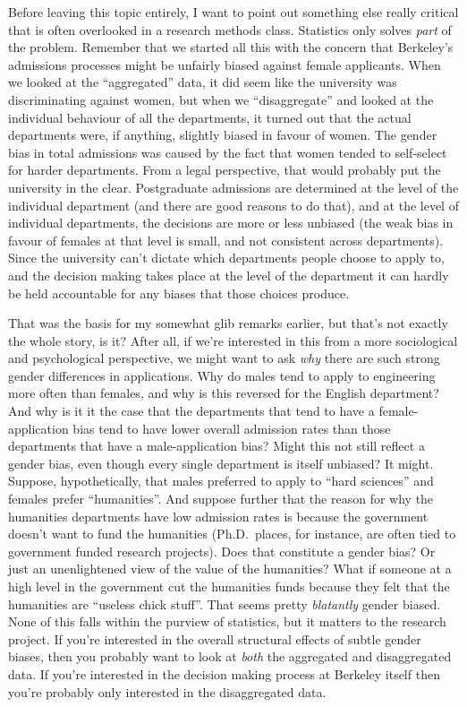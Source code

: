 \documentclass[]{book}
\begin{document}
Before leaving this topic entirely, I want to point out something else really critical that is often overlooked in a research methods class. Statistics only solves \emph{part} of the problem. Remember that we started all this with the concern that Berkeley's admissions processes might be unfairly biased against female applicants. When we looked at the ``aggregated'' data, it did seem like the university was discriminating against women, but when we ``disaggregate'' and looked at the individual behaviour of all the departments, it turned out that the actual departments were, if anything, slightly biased in favour of women. The gender bias in total admissions was caused by the fact that women tended to self-select for harder departments. From a legal perspective, that would probably put the university in the clear. Postgraduate admissions are determined at the level of the individual department (and there are good reasons to do that), and at the level of individual departments, the decisions are more or less unbiased (the weak bias in favour of females at that level is small, and not consistent across departments). Since the university can't dictate which departments people choose to apply to, and the decision making takes place at the level of the department it can hardly be held accountable for any biases that those choices produce.

That was the basis for my somewhat glib remarks earlier, but that's not exactly the whole story, is it? After all, if we're interested in this from a more sociological and psychological perspective, we might want to ask \emph{why} there are such strong gender differences in applications. Why do males tend to apply to engineering more often than females, and why is this reversed for the English department? And why is it it the case that the departments that tend to have a female-application bias tend to have lower overall admission rates than those departments that have a male-application bias? Might this not still reflect a gender bias, even though every single department is itself unbiased? It might. Suppose, hypothetically, that males preferred to apply to ``hard sciences'' and females prefer ``humanities''. And suppose further that the reason for why the humanities departments have low admission rates is because the government doesn't want to fund the humanities (Ph.D.~places, for instance, are often tied to government funded research projects). Does that constitute a gender bias? Or just an unenlightened view of the value of the humanities? What if someone at a high level in the government cut the humanities funds because they felt that the humanities are ``useless chick stuff''. That seems pretty \emph{blatantly} gender biased. None of this falls within the purview of statistics, but it matters to the research project. If you're interested in the overall structural effects of subtle gender biases, then you probably want to look at \emph{both} the aggregated and disaggregated data. If you're interested in the decision making process at Berkeley itself then you're probably only interested in the disaggregated data.
\end{document}
